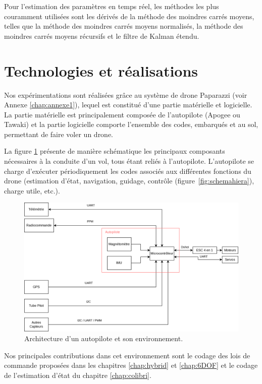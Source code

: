 Pour l'estimation des paramètres en temps réel, les méthodes les plus couramment utilisées sont les dérivés de la méthode des moindres carrés moyens, telles que la méthode des moindres carrés moyens normalisés, la méthode des moindres carrés moyens récursifs et le filtre de Kalman étendu. 

\section{Technologies et réalisations}

Nos expérimentations sont réalisées grâce au système de drone Paparazzi (voir Annexe \ref{chap:annexe1}), lequel est constitué d'une partie matérielle et logicielle. La partie matérielle est principalement composée de l'autopilote (Apogee ou Tawaki) et la partie logicielle comporte l'ensemble des codes, embarqués et au sol, permettant de faire voler un drone. 

La figure \ref{fig:schemaComposent} présente de manière schématique les principaux composants nécessaires à la conduite d'un vol, tous étant reliés à l'autopilote. L'autopilote se charge d'exécuter périodiquement les codes associés aux différentes fonctions du drone (estimation d'état, navigation, guidage, contrôle (figure~\ref{fig:schemahiera}), charge utile, etc.).

\begin{figure}[ht!]
    \centerline{
    \includegraphics[trim=0cm 0cm 0cm 0cm,clip,width=0.7\columnwidth]{figures/arch_materiel.png}}
    \caption{Architecture d'un autopilote et son environnement.}
    \label{fig:schemaComposent}
\end{figure}

Nos principales contributions dans cet environnement sont le codage des lois de commande proposées dans les chapitres \ref{chap:hybrid} et \ref{chap:6DOF} et le codage de l'estimation d'état du chapitre \ref{chap:colibri}. 

